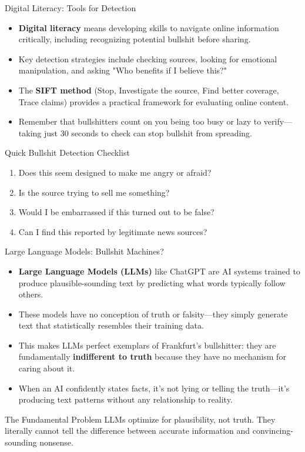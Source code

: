 \documentclass{beamer}
\begin{document}
	\begin{frame}{Digital Literacy: Tools for Detection}
		\begin{itemize}
			\item \textbf{Digital literacy} means developing skills to navigate online information critically, including recognizing potential bullshit before sharing.
			\item Key detection strategies include checking sources, looking for emotional manipulation, and asking "Who benefits if I believe this?"
			\item The \textbf{SIFT method} (Stop, Investigate the source, Find better coverage, Trace claims) provides a practical framework for evaluating online content.
			\item Remember that bullshitters count on you being too busy or lazy to verify—taking just 30 seconds to check can stop bullshit from spreading.
		\end{itemize}
		
		\begin{block}{Quick Bullshit Detection Checklist}
			\scriptsize
			\begin{enumerate}
				\item Does this seem designed to make me angry or afraid?
				\item Is the source trying to sell me something?
				\item Would I be embarrassed if this turned out to be false?
				\item Can I find this reported by legitimate news sources?
			\end{enumerate}
		\end{block}
	\end{frame}
	
	\begin{frame}{Large Language Models: Bullshit Machines?}
		\begin{itemize}
			\item \textbf{Large Language Models (LLMs)} like ChatGPT are AI systems trained to produce plausible-sounding text by predicting what words typically follow others.
			\item These models have no conception of truth or falsity—they simply generate text that statistically resembles their training data.
			\item This makes LLMs perfect exemplars of Frankfurt's bullshitter: they are fundamentally \textbf{indifferent to truth} because they have no mechanism for caring about it.
			\item When an AI confidently states facts, it's not lying or telling the truth—it's producing text patterns without any relationship to reality.
		\end{itemize}
		
		\begin{alertblock}{The Fundamental Problem}
			LLMs optimize for plausibility, not truth. They literally cannot tell the difference between accurate information and convincing-sounding nonsense.
		\end{alertblock}
	\end{frame}
	
\end{document}
